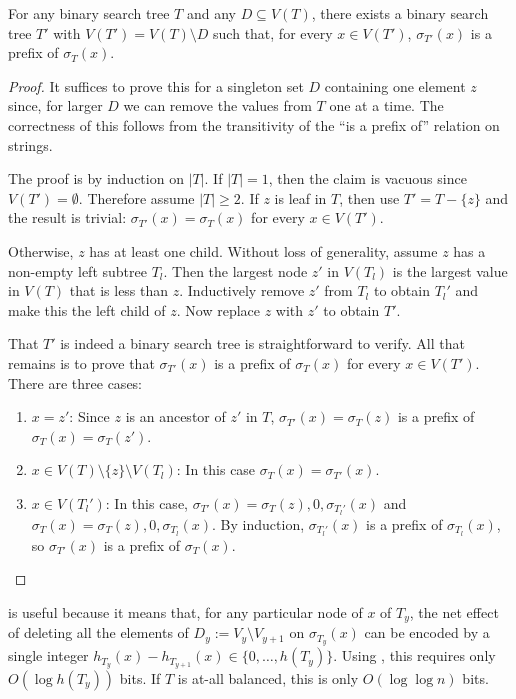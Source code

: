 \documentclass[kpfonts]{patmorin}
\begin{document}
\begin{lem}
  For any binary search tree $T$ and any $D\subseteq V(T)$, there exists a binary search tree $T'$ with $V(T')=V(T)\setminus D$ such that, for every $x\in V(T')$, $\sigma_{T'}(x)$ is a prefix of $\sigma_{T}(x)$.
\end{lem}

\begin{proof}
  It suffices to prove this for a singleton set $D$ containing one element $z$ since, for larger $D$ we can remove the values from $T$ one at a time.  The correctness of this follows from the transitivity of the ``is a prefix of'' relation on strings.
  
  The proof is by induction on $|T|$. If $|T|=1$, then the claim is vacuous since $V(T')=\emptyset$.  Therefore assume $|T|\ge 2$.  If $z$ is leaf in $T$, then use $T'=T-\{z\}$ and the result is trivial: $\sigma_{T'}(x)=\sigma_T(x)$ for every $x\in V(T')$.  
  
  Otherwise, $z$ has at least one child.  Without loss of generality, assume $z$ has a non-empty left subtree $T_l$.  Then the largest node $z'$ in $V(T_l)$ is the largest value in $V(T)$ that is less than $z$. Inductively remove $z'$ from $T_l$ to obtain $T_l'$ and make this the left child of $z$.  Now replace $z$ with $z'$ to obtain $T'$.  
  
  That $T'$ is indeed a binary search tree is straightforward to verify.  All that remains is to prove that $\sigma_{T'}(x)$ is a prefix of $\sigma_T(x)$ for every $x\in V(T')$. There are three cases:
  \begin{enumerate}
    \item $x=z'$: Since $z$ is an ancestor of $z'$ in $T$, $\sigma_{T'}(x)=\sigma_T(z)$ is a prefix of $\sigma_T(x)=\sigma_T(z')$.  
    
    \item $x\in V(T)\setminus\{z\}\setminus V(T_l)$: In this case $\sigma_T(x)=\sigma_{T'}(x)$.  
    
    \item $x\in V(T_l')$: In this case, $\sigma_{T'}(x)=\sigma_{T}(z),0,\sigma_{T_l'}(x)$ and $\sigma_T(x)=\sigma_{T}(z),0,\sigma_{T_l}(x)$.  By induction, $\sigma_{T_l'}(x)$ is a prefix of $\sigma_{T_l}(x)$, so $\sigma_{T'}(x)$ is a prefix of $\sigma_T(x)$. \qedhere
  \end{enumerate}
\end{proof}

 is useful because it means that, for any particular node of $x$ of $T_y$, the net effect of deleting all the elements of $D_y:=V_{y}\setminus V_{y+1}$ on $\sigma_{T_y}(x)$ can be encoded by a single integer $h_{T_y}(x)-h_{T_{y+1}}(x)\in\{0,\ldots,h(T_y)\}$.  Using , this requires only $O(\log h(T_y))$ bits.  If $T$ is at-all balanced, this is only $O(\log\log n)$ bits.
\end{document}
